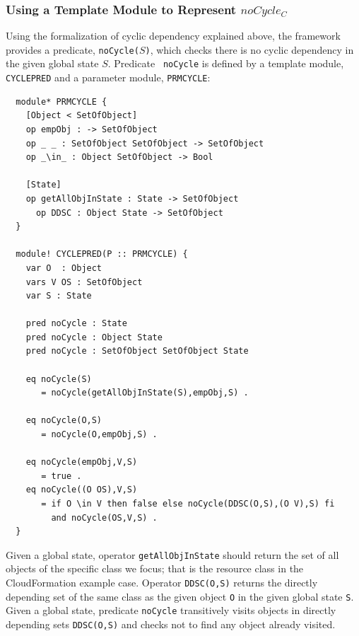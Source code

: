 \documentclass[12pt]{report}
\newcommand{\stt}[1]{{\small{\tt {#1}}}}
\begin{document}
\subsubsection{Using a Template Module to Represent $noCycle_C$}
Using the formalization of cyclic dependency explained above, the
framework provides a predicate, \stt{noCycle($S$)}, which checks there
is no cyclic dependency in the given global state $S$. Predicate {\tt
  noCycle} is defined by a template module, {\tt CYCLEPRED} and a
parameter module, {\tt PRMCYCLE}:
\small
\begin{verbatim}
  module* PRMCYCLE {
    [Object < SetOfObject]
    op empObj : -> SetOfObject
    op _ _ : SetOfObject SetOfObject -> SetOfObject
    op _\in_ : Object SetOfObject -> Bool
  
    [State]
    op getAllObjInState : State -> SetOfObject
      op DDSC : Object State -> SetOfObject
  }

  module! CYCLEPRED(P :: PRMCYCLE) {
    var O  : Object
    vars V OS : SetOfObject
    var S : State
  
    pred noCycle : State
    pred noCycle : Object State
    pred noCycle : SetOfObject SetOfObject State
  
    eq noCycle(S)
       = noCycle(getAllObjInState(S),empObj,S) .
  
    eq noCycle(O,S)
       = noCycle(O,empObj,S) .
  
    eq noCycle(empObj,V,S)
       = true .
    eq noCycle((O OS),V,S)
       = if O \in V then false else noCycle(DDSC(O,S),(O V),S) fi
         and noCycle(OS,V,S) .
  }
\end{verbatim}
\normalsize
Given a global state, operator {\tt getAllObjInState} should return
the set of all objects of the specific class we focus; that is the
resource class in the CloudFormation example case. Operator
\stt{DDSC(O,S)} returns the directly depending set of the same class
as the given object {\tt O} in the given global state {\tt S}.  Given
a global state, predicate {\tt noCycle} transitively visits objects in
directly depending sets \stt{DDSC(O,S)} and checks not to find any
object already visited.
\end{document}
